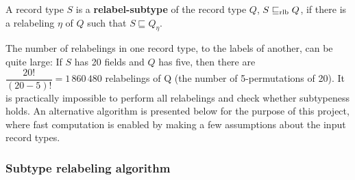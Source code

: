 \begin{definition}
A record type $S$ is a \textbf{relabel-subtype} of the record type $Q$, $S \mathrel{\sqsubseteq_\text{rlb}} Q$, if there is a relabeling $\eta$ of $Q$ such that $S \sqsubseteq Q_\eta$.

\end{definition}

The number of relabelings in one record type, to the labels of another, can be quite large:
If $S$ has 20 fields and $Q$ has five, then there are $\dfrac{20!}{(20-5)!} = 1\,860\,480$ relabelings of Q (the number of 5-permutations of 20).
It is practically impossible to perform all relabelings and check whether subtypeness holds.
An alternative algorithm is presented below for the purpose of this project, where fast computation is enabled by making a few assumptions about the input record types.

\subsubsection{Subtype relabeling algorithm}

